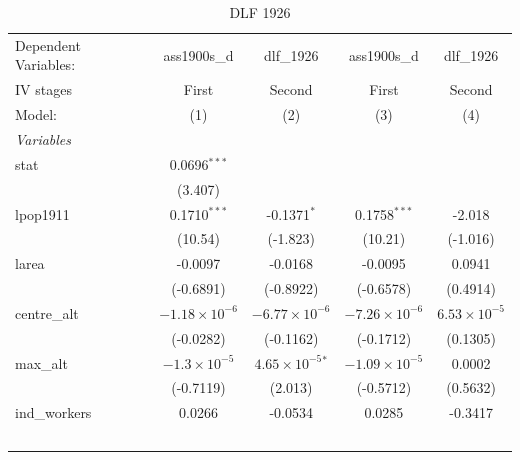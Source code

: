 
\begin{table}[htbp]
   \caption{DLF 1926}
   \centering
   \begin{tabular}{lcccc}
      \tabularnewline \midrule \midrule
      Dependent Variables:             & ass1900s\_d            & dlf\_1926                   & ass1900s\_d            & dlf\_1926\\   
      IV stages                        & First                  & Second                      & First                  & Second \\   
      Model:                           & (1)                    & (2)                         & (3)                    & (4)\\  
      \midrule
      \emph{Variables}\\
      stat                             & 0.0696$^{***}$         &                             &                        &   \\   
                                       & (3.407)                &                             &                        &   \\   
      lpop1911                         & 0.1710$^{***}$         & -0.1371$^{*}$               & 0.1758$^{***}$         & -2.018\\   
                                       & (10.54)                & (-1.823)                    & (10.21)                & (-1.016)\\   
      larea                            & -0.0097                & -0.0168                     & -0.0095                & 0.0941\\   
                                       & (-0.6891)              & (-0.8922)                   & (-0.6578)              & (0.4914)\\   
      centre\_alt                      & $-1.18\times 10^{-6}$  & $-6.77\times 10^{-6}$       & $-7.26\times 10^{-6}$  & $6.53\times 10^{-5}$\\    
                                       & (-0.0282)              & (-0.1162)                   & (-0.1712)              & (0.1305)\\   
      max\_alt                         & $-1.3\times 10^{-5}$   & $4.65\times 10^{-5}$$^{*}$  & $-1.09\times 10^{-5}$  & 0.0002\\   
                                       & (-0.7119)              & (2.013)                     & (-0.5712)              & (0.5632)\\   
      ind\_workers                     & 0.0266                 & -0.0534                     & 0.0285                 & -0.3417\\   
$$
\end{tabular}
\end{table}
